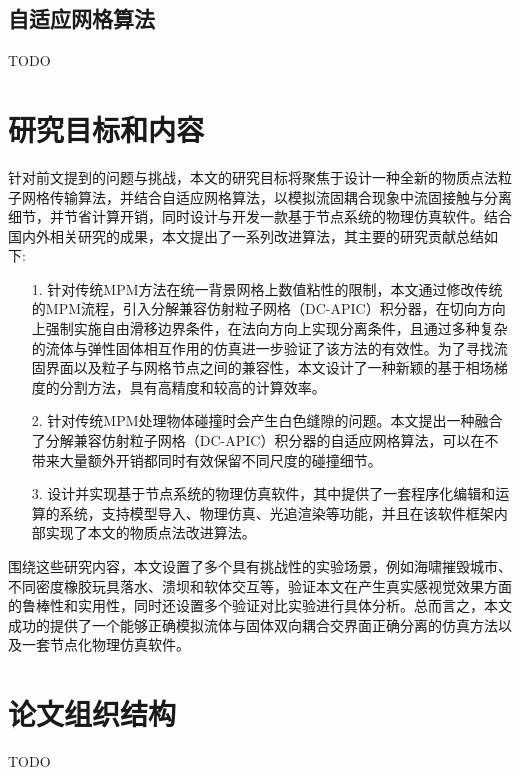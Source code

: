 \subsection{自适应网格算法}
TODO

\section{研究目标和内容}
针对前文提到的问题与挑战，本文的研究目标将聚焦于设计一种全新的物质点法粒子网格传输算法，并结合自适应网格算法，以模拟流固耦合现象中流固接触与分离细节，并节省计算开销，同时设计与开发一款基于节点系统的物理仿真软件。结合国内外相关研究的成果，本文提出了一系列改进算法，其主要的研究贡献总结如下:

\begin{enumerate} 
    \item[1.] 针对传统MPM方法在统一背景网格上数值粘性的限制，本文通过修改传统的MPM流程，引入分解兼容仿射粒子网格（DC-APIC）积分器，在切向方向上强制实施自由滑移边界条件，在法向方向上实现分离条件，且通过多种复杂的流体与弹性固体相互作用的仿真进一步验证了该方法的有效性。为了寻找流固界面以及粒子与网格节点之间的兼容性，本文设计了一种新颖的基于相场梯度的分割方法，具有高精度和较高的计算效率。
    \item[2.] 针对传统MPM处理物体碰撞时会产生白色缝隙的问题。本文提出一种融合了分解兼容仿射粒子网格（DC-APIC）积分器的自适应网格算法，可以在不带来大量额外开销都同时有效保留不同尺度的碰撞细节。
    \item[3.] 设计并实现基于节点系统的物理仿真软件，其中提供了一套程序化编辑和运算的系统，支持模型导入、物理仿真、光追渲染等功能，并且在该软件框架内部实现了本文的物质点法改进算法。
 \end{enumerate}
 围绕这些研究内容，本文设置了多个具有挑战性的实验场景，例如海啸摧毁城市、不同密度橡胶玩具落水、溃坝和软体交互等，验证本文在产生真实感视觉效果方面的鲁棒性和实用性，同时还设置多个验证对比实验进行具体分析。总而言之，本文成功的提供了一个能够正确模拟流体与固体双向耦合交界面正确分离的仿真方法以及一套节点化物理仿真软件。

\section{论文组织结构}
TODO